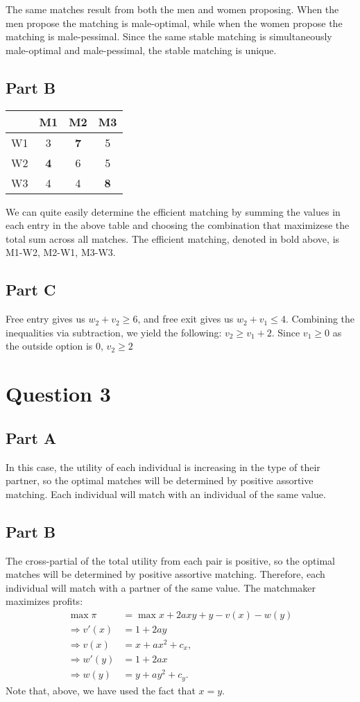 \documentclass[11pt]{article} %
\begin{document}
The same matches result from both the men and women proposing. When the men propose the matching is male-optimal, while when the women propose the matching is male-pessimal. Since the same stable matching is simultaneously male-optimal and male-pessimal, the stable matching is unique.

\subsection{Part B}
\begin{center}
\begin{tabular}{c|ccc}
 & M1 & M2 & M3\\
\hline
W1 & 3 & \textbf{7} & 5 \\
W2 & \textbf{4} & 6 & 5 \\
W3 & 4 & 4 & \textbf{8}
\end{tabular}
\end{center}
We can quite easily determine the efficient matching by summing the values in each entry in the above table and choosing the combination that maximizese the total sum across all matches. The efficient matching, denoted in bold above, is M1-W2, M2-W1, M3-W3.

\subsection{Part C}
Free entry gives us $w_2+v_2 \geq 6$, and free exit gives us $w_2 + v_1 \leq 4$. Combining the inequalities via subtraction, we yield the following: $v_2 \geq v_1 + 2$. Since $v_1\geq 0 $ as the outside option is $0$, $v_2 \geq 2$

\section{Question 3}
\subsection{Part A}
In this case, the utility of each individual is increasing in the type of their partner, so the optimal matches will be determined by positive assortive matching. Each individual will match with an individual of the same value.

\subsection{Part B}
The cross-partial of the total utility from each pair is positive, so the optimal matches will be determined by positive assortive matching. Therefore, each individual will match with a partner of the same value.
The matchmaker maximizes profits:
\begin{align*}
\max\pi &= \max x + 2axy + y - v(x) - w(y)\\
\Rightarrow v'(x) &= 1 + 2ay \\
\Rightarrow v(x) &= x+ax^2 + c_x, \\
\Rightarrow w'(y) &= 1 + 2ax \\
\Rightarrow w(y) &= y+ay^2 + c_y.
\end{align*}
Note that, above, we have used the fact that $x=y.$
\end{document}
